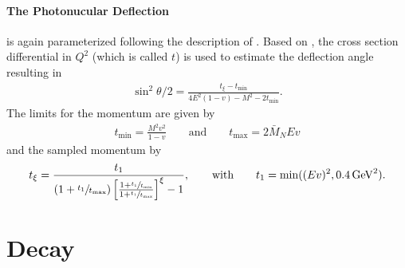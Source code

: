 \paragraph{The Photonucular Deflection} is again parameterized following the description of \cite{GEANT4}.
Based on \cite{Borog75}, the cross section differential in $Q^2$ (which is called $t$) is used to estimate the deflection angle resulting in
\begin{align}
    \sin^2 \theta/2 = \frac{t_\xi - t_{\min}}{4 E^2 (1 - v) - M^2 - 2 t_{\min}} .
\end{align}
The limits for the momentum are given by
\begin{align}
    t_{\min} = \frac{M^2 v^2}{1 - v}
    \qquad \text{and} \qquad
    t_{\max} = 2 \bar{M}_N E v
\end{align}
and the sampled momentum by
\begin{align*}
    t_\xi = \frac{t_1}{(1 + \sfrac{t_1}{t_{\max}}) \left[ \frac{1 + \sfrac{t_1}{t_{\min}}}{1 + \sfrac{t_1}{t_{\max}}} \right]^\xi - 1} ,
    \qquad
    \text{with}
    \qquad
    t_1 = \min((Ev)^2, \SI{0.4}{GeV^2}) .
\end{align*}

\section{Decay} \label{sec:decay_dsigma}


